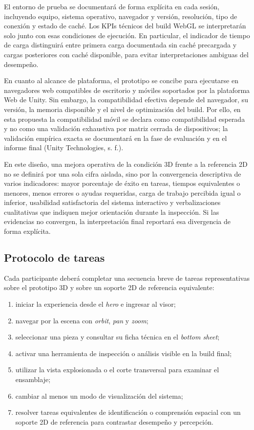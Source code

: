 El entorno de prueba se documentar\'a de forma expl\'icita en cada sesi\'on, incluyendo equipo, sistema operativo, navegador y versi\'on, resoluci\'on, tipo de conexi\'on y estado de cach\'e. Los KPIs t\'ecnicos del build WebGL se interpretar\'an solo junto con esas condiciones de ejecuci\'on. En particular, el indicador de tiempo de carga distinguir\'a entre primera carga documentada sin cach\'e precargada y cargas posteriores con cach\'e disponible, para evitar interpretaciones ambiguas del desempe\~no.

En cuanto al alcance de plataforma, el prototipo se concibe para ejecutarse en navegadores web compatibles de escritorio y m\'oviles soportados por la plataforma Web de Unity. Sin embargo, la compatibilidad efectiva depende del navegador, su versi\'on, la memoria disponible y el nivel de optimizaci\'on del build. Por ello, en esta propuesta la compatibilidad m\'ovil se declara como compatibilidad esperada y no como una validaci\'on exhaustiva por matriz cerrada de dispositivos; la validaci\'on emp\'irica exacta se documentar\'a en la fase de evaluaci\'on y en el informe final (Unity Technologies, s. f.).

En este dise\~no, una mejora operativa de la condici\'on 3D frente a la referencia 2D no se definir\'a por una sola cifra aislada, sino por la convergencia descriptiva de varios indicadores: mayor porcentaje de \'exito en tareas, tiempos equivalentes o menores, menos errores o ayudas requeridas, carga de trabajo percibida igual o inferior, usabilidad satisfactoria del sistema interactivo y verbalizaciones cualitativas que indiquen mejor orientaci\'on durante la inspecci\'on. Si las evidencias no convergen, la interpretaci\'on final reportar\'a esa divergencia de forma expl\'icita.

\subsection{Protocolo de tareas}

Cada participante deber\'a completar una secuencia breve de tareas representativas sobre el prototipo 3D y sobre un soporte 2D de referencia equivalente:

\begin{enumerate}
    \item iniciar la experiencia desde el \textit{hero} e ingresar al visor;
    \item navegar por la escena con \textit{orbit}, \textit{pan} y \textit{zoom};
    \item seleccionar una pieza y consultar su ficha t\'ecnica en el \textit{bottom sheet};
    \item activar una herramienta de inspecci\'on o an\'alisis visible en la build final;
    \item utilizar la vista explosionada o el corte transversal para examinar el ensamblaje;
    \item cambiar al menos un modo de visualizaci\'on del sistema;
    \item resolver tareas equivalentes de identificaci\'on o comprensi\'on espacial con un soporte 2D de referencia para contrastar desempe\~no y percepci\'on.
\end{enumerate}

